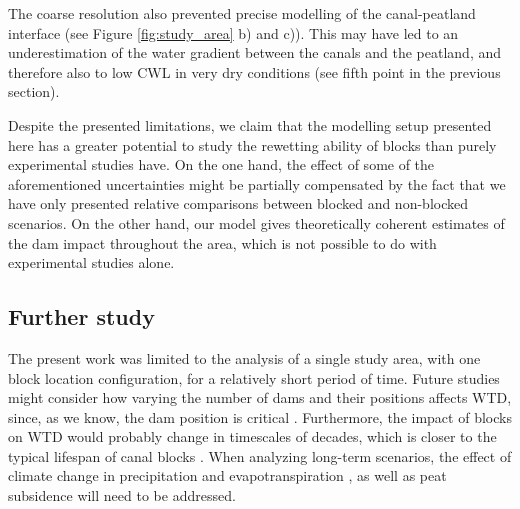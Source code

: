 \documentclass[bg, manuscript]{copernicus}
\begin{document}
The coarse resolution also prevented precise modelling of the canal-peatland interface (see Figure \ref{fig:study_area} b) and c)).
This may have led to an underestimation of the water gradient between the canals and the peatland, and therefore also to low CWL in very dry conditions (see fifth point in the previous section).



Despite the presented limitations, we claim that the modelling setup presented here has a greater potential to study the rewetting ability of blocks than purely experimental studies have.
On the one hand, the effect of some of the aforementioned uncertainties might be partially compensated by the fact that we have only presented relative comparisons between blocked and non-blocked scenarios.
On the other hand, our model gives theoretically coherent estimates of the dam impact throughout the area, which is not possible to do  with  experimental studies alone.

\subsection{Further study}
The present work was limited to the analysis of a single study area, with one block location configuration, for a relatively short period of time.
Future studies might consider how varying the number of dams and their positions affects WTD, since, as we know,  the dam position is critical \citep{urzainkiCanalBlockingOptimization2020}.
Furthermore, the impact of blocks on WTD would probably change in timescales of decades, which is closer to the typical lifespan of canal blocks \citep{ritzemaCanalBlockingStrategies2014, dohongReviewTechniquesEffective2018}.
When analyzing long-term scenarios, the effect of climate change in precipitation and evapotranspiration \citep{gallego-salaLatitudinalLimitsPredicted2018, wangPotentialShiftCarbon2018, caiIncreasingFrequencyExtreme2014, portnerClimateChange20222022}, as well as peat subsidence \citep{evansRatesSpatialVariability2019, hoytWidespreadSubsidenceCarbon2020, evansLongtermTrajectoryTemporal2022} will need to be addressed.
\end{document}
